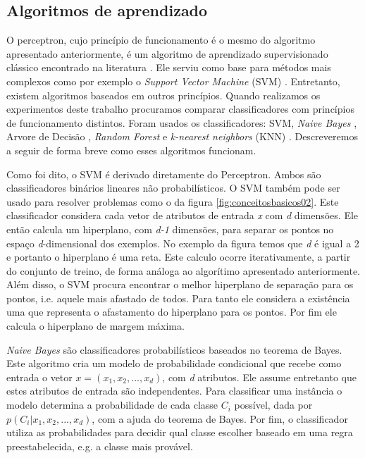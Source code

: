 \subsection{Algoritmos de aprendizado}

O perceptron, cujo princípio de funcionamento é o mesmo do algoritmo apresentado anteriormente, é um algoritmo de aprendizado supervisionado clássico encontrado na literatura \cite{Rosenblatt}.
Ele serviu como base para métodos mais complexos como por exemplo o \textit{Support Vector Machine} (SVM) \cite{Chang}.
Entretanto, existem algoritmos baseados em outros princípios.
Quando realizamos os experimentos deste trabalho procuramos comparar classificadores com princípios de funcionamento distintos.
Foram usados os classificadores: SVM, \textit{Naive Bayes} \cite{Murphy}, Arvore de Decisão \cite{Quinlan}, \textit{Random Forest} \cite{Breiman} e \textit{k-nearest neighbors} (KNN) \cite{Duda}.
Descreveremos a seguir de forma breve como esses algoritmos funcionam.

Como foi dito, o SVM é derivado diretamente do Perceptron.
Ambos são classificadores binários lineares não probabilísticos.
O SVM também pode ser usado para resolver problemas como o da figura \ref{fig:conceitosbasicos02}.
Este classificador considera cada vetor de atributos de entrada \textit{x} com \textit{d} dimensões.
Ele então calcula um hiperplano, com \textit{d-1} dimensões, para separar os pontos no espaço \textit{d}-dimensional dos exemplos.
No exemplo da figura temos que \textit{d} é igual a 2 e portanto o hiperplano é uma reta.
Este calculo ocorre iterativamente, a partir do conjunto de treino, de forma análoga ao algorítimo apresentado anteriormente.
Além disso, o SVM procura encontrar o melhor hiperplano de separação para os pontos, i.e. aquele mais afastado de todos. 
Para tanto ele considera a existência uma  que representa o afastamento do hiperplano para os pontos.
Por fim ele calcula o hiperplano de margem máxima.

\textit{Naive Bayes} são classificadores probabilísticos baseados no teorema de Bayes.
Este algoritmo cria um modelo de probabilidade condicional que recebe como entrada o vetor $ \textit{x} = (x_1, x_2, ... , x_d) $, com \textit{d} atributos.
Ele assume entretanto que estes atributos de entrada são independentes.
Para classificar uma instância o modelo determina a probabilidade de cada classe $C_i$ possível, dada por $p(C_i|x_1, x_2, ... , x_d)$, com a ajuda do teorema de Bayes.
Por fim, o classificador utiliza as probabilidades para decidir qual classe escolher baseado em uma regra preestabelecida, e.g. a classe mais provável.

